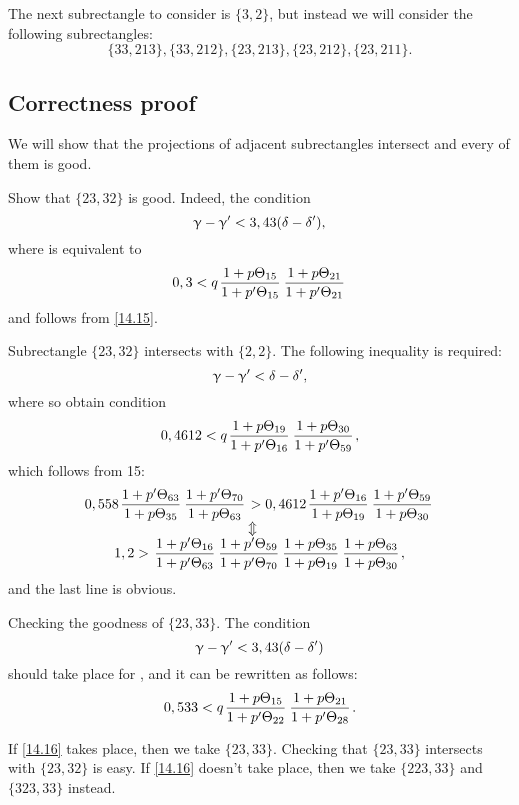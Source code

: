 The next subrectangle to consider is $\{3,2\}$, but instead we will consider the following subrectangles:
\begin{equation*}
	\{33, 213\}, \{33, 212\}, \{23, 213\}, \{23, 212\}, \{23, 211\}.
\end{equation*}

\subsection{Correctness proof}

We will show that the projections of adjacent subrectangles intersect and every of them is good.

Show that $\{23,32\}$ is good.
Indeed, the condition
\begin{equation*}
	\upgamma - \upgamma' < 3,43(\delta - \delta'),
\end{equation*}
where
is equivalent to
\begin{equation*}
	0,3 < q \up{15}{15} \up{21}{21}
\end{equation*}
and follows from \ref{14.15}.

Subrectangle $\{23, 32\}$ intersects with $\{2,2\}$. The following inequality is required:
\begin{equation*}
	\upgamma - \upgamma' < \delta - \delta',
\end{equation*}
where
so obtain condition
\begin{equation*}
	0,4612 < q \up{19}{16} \up{30}{59},
\end{equation*}
which follows from 15:
\begin{gather*}
	0,558 \pu{63}{35} \pu{70}{63} > 0,4612 \pu{16}{19} \pu{59}{30}\\
	\ArrowBetweenLines
	1,2 > \pp{16}{63} \pp{59}{70} \uu{35}{19} \uu{63}{30},
\end{gather*}
and the last line is obvious.

Checking the goodness of $\{23, 33\}$.
The condition
\begin{equation*}
	\upgamma - \upgamma' < 3,43(\delta - \delta')
\end{equation*}
should take place for
,
and it can be rewritten as follows:
\begin{equation}\label{14.16}
	0,533 < q \up{15}{22} \up{21}{28}.
\end{equation}

If \ref{14.16} takes place, then we take $\{23, 33\}$.
Checking that $\{23, 33\}$ intersects with $\{23, 32\}$ is easy.
If \ref{14.16} doesn't take place, then we take $\{223, 33\}$ and $\{323, 33\}$ instead.

